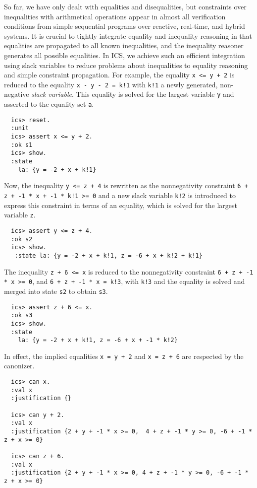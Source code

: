 \documentclass[12pt]{article}
\begin{document}
So far, we have only dealt with equalities and disequalities, but
constraints over inequalities with arithmetical operations appear in almost all
verification conditions from simple sequential programs over reactive, real-time,
and hybrid systems.  It is crucial to tightly integrate equality and inequality
reasoning in that equalities are propagated to all known inequalities, and the
inequality reasoner generates all possible equalities.  In ICS, we achieve
such an efficient integration using slack variables to reduce problems about
inequalities to equality reasoning and simple constraint propagation.
For example, the equality {\tt x <= y + 2} is reduced to the equality
{\tt x - y - 2 = k!1} with {\tt k!1} a newly generated, non-negative 
{\em slack variable}\@.  This equality is solved for the largest variable {\tt y} 
and asserted to the equality set {\tt a}\@.
  \begin{verbatim}
  ics> reset.
  :unit
  ics> assert x <= y + 2.
  :ok s1
  ics> show.
  :state
    la: {y = -2 + x + k!1}
  \end{verbatim}
Now, the inequality {\tt y <= z + 4} is rewritten as the nonnegativity
constraint {\tt 6 + z + -1 * x + -1 * k!1 >= 0} and a new slack variable {\tt k!2}
is introduced to express this constraint in terms of an equality, which is
solved for the largest variable {\tt z}\@.
  \begin{verbatim}
  ics> assert y <= z + 4.
  :ok s2
  ics> show.
   :state la: {y = -2 + x + k!1, z = -6 + x + k!2 + k!1}
  \end{verbatim}
The inequality {\tt z + 6 <= x} is reduced to the nonnegativity constraint
{\tt 6 + z + -1 * x >= 0}, and {\tt 6 + z + -1 * x = k!3}, with {\tt k!3}
and the equality is solved and merged into state {\tt s2} to obtain {\tt s3}\@.
  \begin{verbatim}
  ics> assert z + 6 <= x.
  :ok s3
  ics> show.
  :state
    la: {y = -2 + x + k!1, z = -6 + x + -1 * k!2}
  \end{verbatim}
In effect, the implied equalities {\tt x = y + 2} and {\tt x = z + 6}
are respected by the canonizer.
  \begin{verbatim}
  ics> can x.
  :val x
  :justification {}

  ics> can y + 2.
  :val x
  :justification {2 + y + -1 * x >= 0,  4 + z + -1 * y >= 0, -6 + -1 * z + x >= 0}

  ics> can z + 6.
  :val x
  :justification {2 + y + -1 * x >= 0, 4 + z + -1 * y >= 0, -6 + -1 * z + x >= 0}
  \end{verbatim} 
\end{document}
